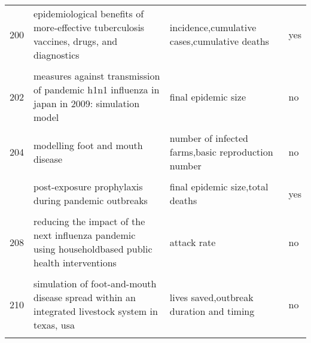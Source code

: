 \documentclass[
]{article}
\begin{document}
\begin{landscape}
\begin{longtable}{l>{\raggedright\arraybackslash}p{4cm}>{\raggedright\arraybackslash}p{6cm}l}
200 & epidemiological benefits of more-effective tuberculosis vaccines, drugs, and diagnostics & incidence,cumulative cases,cumulative deaths & yes\\
\addlinespace
\cellcolor{gray!6}{201} & \cellcolor{gray!6}{household epidemics: modelling effects of early stage vaccination} & \cellcolor{gray!6}{household reproduction number for} & \cellcolor{gray!6}{yes}\\
202 & measures against transmission of pandemic h1n1 influenza in japan in 2009: simulation model & final epidemic size & no\\
\cellcolor{gray!6}{203} & \cellcolor{gray!6}{modeling vaccination campaigns and the fall/winter 2009 activity of the new a(h1n1) influenza in the northern hemisphere} & \cellcolor{gray!6}{final epidemic size,attack rate,peak size} & \cellcolor{gray!6}{yes}\\
204 & modelling foot and mouth disease & number of infected farms,basic reproduction number & no\\
\cellcolor{gray!6}{205} & \cellcolor{gray!6}{modelling of the influenza a(h1n1)v outbreak in mexico city, april-may 2009, with control sanitary measures} & \cellcolor{gray!6}{attack rate} & \cellcolor{gray!6}{no}\\
\addlinespace
206 & post-exposure prophylaxis during pandemic outbreaks & final epidemic size,total deaths & yes\\
\cellcolor{gray!6}{207} & \cellcolor{gray!6}{potential for a global dynamic of influenza a (h1n1)} & \cellcolor{gray!6}{final epidemic size,attack rate,mortality rate} & \cellcolor{gray!6}{no}\\
208 & reducing the impact of the next influenza pandemic using householdbased public health interventions & attack rate & no\\
\cellcolor{gray!6}{209} & \cellcolor{gray!6}{seasonal transmission potential and activity peaks of the new influenza a(h1n1): a monte carlo likelihood analysis based on human mobility} & \cellcolor{gray!6}{final epidemic size,timing of peak,incidence} & \cellcolor{gray!6}{yes}\\
210 & simulation of foot-and-mouth disease spread within an integrated livestock system in texas, usa & lives saved,outbreak duration and timing & no\\
\addlinespace
\cellcolor{gray!6}{211} & \cellcolor{gray!6}{the transmissibility and control of pandemic influenza a (h1n1) virus} & \cellcolor{gray!6}{attack rate,r0} & \cellcolor{gray!6}{yes}\\

\end{longtable}
\end{landscape}
\end{document}
